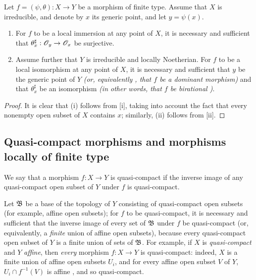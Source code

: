 \begin{cor}[6.5.5]
\label{1.6.5.5}
Let $f=(\psi,\theta):X\to Y$ be a morphism of finite type.
Assume that $X$ is irreducible, and denote by $x$ its generic point, and let $y=\psi(x)$.
\begin{enumerate}[label=\emph{(\roman*)}]
  \item For $f$ to be a local immersion at any point of $X$, it is necessary and sufficient that $\theta_x^\sharp:\OO_y\to\OO_x$ be surjective.
  \item Assume further that $Y$ is irreducible and locally Noetherian.
    For $f$ to be a local isomorphism at any point of $X$, it is necessary and sufficient that $y$ be the generic point of $Y$ \emph{(or, equivalently , that $f$ be a \emph{dominant} morphism)} and that $\theta_x^\sharp$ be an isomorphism \emph{(in other words, that $f$ be \emph{birational} )}.
\end{enumerate}
\end{cor}

\begin{proof}
\label{proof-1.6.5.5}
It is clear that (i) follows from [i], taking into account the fact that every nonempty open subset of $X$ contains $x$;
similarly, (ii) follows from [ii].
\end{proof}

\subsection{Quasi-compact morphisms and morphisms locally of finite type}
\label{subsection:quasi-compact-morphisms-and-morphisms-locally-of-finite-type}

\begin{defn}[6.6.1]
\label{1.6.6.1}
We say that a morphism $f: X\to Y$ is quasi-compact if the inverse image of any quasi-compact open subset of $Y$ under $f$ is quasi-compact.
\end{defn}

Let $\mathfrak{B}$ be a base of the topology of $Y$ consisting of quasi-compact open subsets (for example, affine open subsets);
for $f$ to be quasi-compact, it is necessary and sufficient that the inverse image of every set of $\mathfrak{B}$ under $f$ be quasi-compact (or, equivalently, a \emph{finite} union of affine open subsets), because every quasi-compact open subset of $Y$ is a finite union of sets of $\mathfrak{B}$.
For example, if $X$ is \emph{quasi-compact} and $Y$ \emph{affine}, then \emph{every} morphism $f: X\to Y$ is quasi-compact:
indeed, $X$ is a finite union of affine open subsets $U_i$, and for every affine open subset $V$ of $Y$, $U_i\cap f^{-1}(V)$ is affine , and so quasi-compact.

